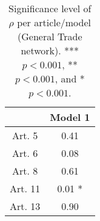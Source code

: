 \begin{table}[ht]
\centering
\begin{tabular}{cc}
  \toprule
 & Model 1 \\ 
  \midrule
Art. 5 & 0.41   \\ 
   \midrule
Art. 6 & 0.08   \\ 
   \midrule
Art. 8 & 0.61   \\ 
   \midrule
Art. 11 & 0.01 * \\ 
   \midrule
Art. 13 & 0.90   \\ 
   \bottomrule
\end{tabular}
\caption{Significance level of $\rho$ per article/model (General Trade network). *** $p < 0.001$, ** $p < 0.001$, and * $p < 0.001$.} 
\end{table}
